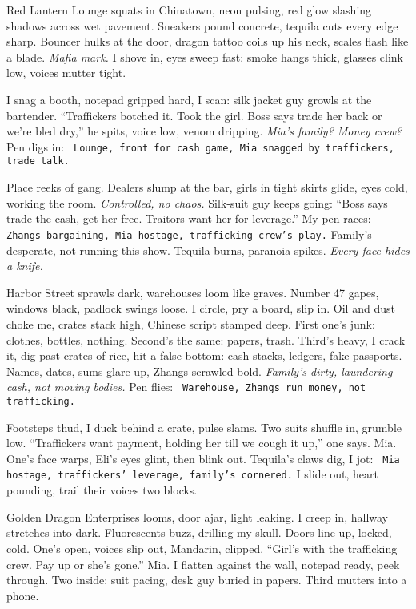 \documentclass[12pt]{article} %
\newcommand{\note}[1]{\texttt{\small \color{DarkGray} #1}}
\begin{document}
Red Lantern Lounge squats in Chinatown, neon pulsing, red glow slashing shadows across wet pavement. Sneakers pound concrete, tequila cuts every edge sharp. Bouncer hulks at the door, dragon tattoo coils up his neck, scales flash like a blade. \textit{Mafia mark.} I shove in, eyes sweep fast: smoke hangs thick, glasses clink low, voices mutter tight.

I snag a booth, notepad gripped hard, I scan: silk jacket guy growls at the bartender. “Traffickers botched it. Took the girl. Boss says trade her back or we’re bled dry,” he spits, voice low, venom dripping. \textit{Mia’s family? Money crew?} Pen digs in: \note{Lounge, front for cash game, Mia snagged by traffickers, trade talk.}

Place reeks of gang. Dealers slump at the bar, girls in tight skirts glide, eyes cold, working the room. \textit{Controlled, no chaos.} Silk-suit guy keeps going: “Boss says trade the cash, get her free. Traitors want her for leverage.” My pen races: \note{Zhangs bargaining, Mia hostage, trafficking crew’s play.} Family’s desperate, not running this show. Tequila burns, paranoia spikes. \textit{Every face hides a knife.}

Harbor Street sprawls dark, warehouses loom like graves. Number 47 gapes, windows black, padlock swings loose. I circle, pry a board, slip in. Oil and dust choke me, crates stack high, Chinese script stamped deep. First one’s junk: clothes, bottles, nothing. Second’s the same: papers, trash. Third’s heavy, I crack it, dig past crates of rice, hit a false bottom: cash stacks, ledgers, fake passports. Names, dates, sums glare up, Zhangs scrawled bold. \textit{Family’s dirty, laundering cash, not moving bodies.} Pen flies: \note{Warehouse, Zhangs run money, not trafficking.}

Footsteps thud, I duck behind a crate, pulse slams. Two suits shuffle in, grumble low. “Traffickers want payment, holding her till we cough it up,” one says. \textnormal{Mia}. One’s face warps, \textnormal{Eli}’s eyes glint, then blink out. Tequila’s claws dig, I jot: \note{Mia hostage, traffickers’ leverage, family’s cornered.} I slide out, heart pounding, trail their voices two blocks.

Golden Dragon Enterprises looms, door ajar, light leaking. I creep in, hallway stretches into dark. Fluorescents buzz, drilling my skull. Doors line up, locked, cold. One’s open, voices slip out, Mandarin, clipped. “Girl’s with the trafficking crew. Pay up or she’s gone.” \textnormal{Mia}. I flatten against the wall, notepad ready, peek through. Two inside: suit pacing, desk guy buried in papers. Third mutters into a phone.
\end{document}
